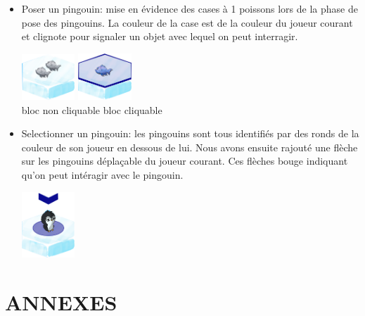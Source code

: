\documentclass{report}
\begin{document}
\begin{itemize}
\item Poser un pingouin: mise en évidence des cases à 1 poissons lors de la phase de pose des pingouins. La couleur de la case est de la couleur du joueur courant et clignote pour signaler un objet avec lequel on peut interragir.
  \begin{center}
    
    \includegraphics[width=2cm]{image/bloc_simple.png}    
    \hspace{1cm}
    \includegraphics[width=2cm]{image/bloc_mev.png}
    \\
    bloc non cliquable \hspace{0.5cm} bloc cliquable
  \end{center}

\item Selectionner un pingouin: les pingouins sont tous identifiés par des ronds de la couleur de son joueur en dessous de lui. Nous avons ensuite rajouté une flèche sur les pingouins déplaçable du joueur courant. Ces flèches bouge indiquant qu'on peut intéragir avec le pingouin.
  \begin{center}
    \includegraphics[width=2cm]{image/bloc_pingouin.png}    
  \end{center}
\end{itemize}

\part*{ANNEXES}
\end{document}
